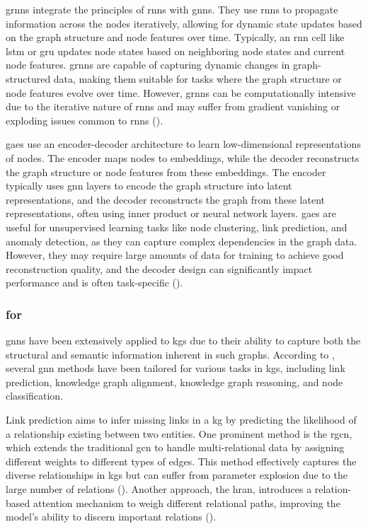 \glspl{grnn} integrate the principles of \glspl{rnn} with \glspl{gnn}.
They use \glspl{rnn} to propagate information across the nodes iteratively, allowing for dynamic state updates based on the graph structure and node features over time.
Typically, an \gls{rnn} cell like \gls{lstm} or \gls{gru} updates node states based on neighboring node states and current node features.
\glspl{grnn} are capable of capturing dynamic changes in graph-structured data, making them suitable for tasks where the graph structure or node features evolve over time.
However, \glspl{grnn} can be computationally intensive due to the iterative nature of \glspl{rnn} and may suffer from gradient vanishing or exploding issues common to \glspl{rnn} (\cite{Pareja2019}).

\glspl{gae} use an encoder-decoder architecture to learn low-dimensional representations of nodes.
The encoder maps nodes to embeddings, while the decoder reconstructs the graph structure or node features from these embeddings.
The encoder typically uses \gls{gnn} layers to encode the graph structure into latent representations, and the decoder reconstructs the graph from these latent representations, often using inner product or neural network layers.
\glspl{gae} are useful for unsupervised learning tasks like node clustering, link prediction, and anomaly detection, as they can capture complex dependencies in the graph data.
However, they may require large amounts of data for training to achieve good reconstruction quality, and the decoder design can significantly impact performance and is often task-specific (\cite{Kipf2017,Wang2016}).

\subsubsection*{ for }
\glspl{gnn} have been extensively applied to \glspl{kg} due to their ability to capture both the structural and semantic information inherent in such graphs.
According to \cite{Ye2022}, several \gls{gnn} methods have been tailored for various tasks in \glspl{kg}, including link prediction, knowledge graph alignment, knowledge graph reasoning, and node classification.

Link prediction aims to infer missing links in a \gls{kg} by predicting the likelihood of a relationship existing between two entities.
One prominent method is the \gls{rgcn}, which extends the traditional \gls{gcn} to handle multi-relational data by assigning different weights to different types of edges.
This method effectively captures the diverse relationships in \glspl{kg} but can suffer from parameter explosion due to the large number of relations (\cite{Schlichtkrull2018}).
Another approach, the \gls{hran}, introduces a relation-based attention mechanism to weigh different relational paths, improving the model's ability to discern important relations (\cite{Li2022}).

